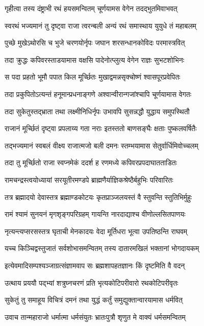 \twolineshloka
{गृहीत्वा तस्य दंष्ट्राभी रथं हयसमन्वितम्}
{चूर्णयामस वेगेन तदद्भुतमिवाभवत्}%

\twolineshloka
{स्वरथं भज्यमानं तु दृष्ट्वा राजा त्वरन्बली}
{अन्यं रथं समास्थाय युयुधे तं महाबलम्}%

\twolineshloka
{पुच्छे मुखेऽथोरसि च भुजे चरणयोर्नृपः}
{जघान शरसन्धानकोविदः परमास्त्रवित्}%

\twolineshloka
{तदा क्रुद्धः कपिवरस्ताडयामास वक्षसि}
{पादेनोत्प्लुत्य वेगेन राज्ञः सुभटशोभिनः}%

\twolineshloka
{स पदा प्रहतो भूमौ पपात किल मूर्च्छितः}
{मुखाद्वमन्नसृक्चोष्णं श्वासपूरप्रवेपितः}%

\twolineshloka
{तदा प्रकुपितोऽत्यन्तं हनूमान्प्रधनाङ्गणे}
{अश्वान्वीरान्गजांश्चापि चूर्णयामास वेगतः}%

\twolineshloka
{तदा सुकेतुस्तद्भ्राता तथा लक्ष्मीनिधिर्नृपः}
{उभावपि सुसन्नद्धौ युद्धाय समुपस्थितौ}%

\twolineshloka
{राजानं मूर्च्छितं दृष्ट्वा प्रपलाय्य गता नराः}
{इतस्ततो बाणसङ्घैः क्षताः पुष्कलवर्षितैः}%

\twolineshloka
{तद्भज्यमानं स्वबलं वीक्ष्य राजात्मजो बली}
{दमनः स्तम्भयामास सेतुर्वार्धिमिवोच्चलम्}%

\twolineshloka
{तदा तु मूर्च्छितो राजा स्वप्नमेकं ददर्श ह}
{रणमध्ये कपिवरप्रपदाघातताडितः}%

\twolineshloka
{रामचन्द्रस्त्वयोध्यायां सरयूतीरमण्डपे}
{ब्राह्मणैर्याज्ञिकश्रेष्ठैर्बहुभिः परिवारितः}%

\twolineshloka
{तत्र ब्रह्मादयो देवास्तत्र ब्रह्माण्डकोटयः}
{कृतप्राञ्जलयस्तं वै स्तुवन्ति स्तुतिभिर्मुहुः}%

\twolineshloka
{रामं श्यामं सुनयनं मृगशृङ्गपरिग्रहम्}
{गायन्ति नारदाद्याश्च वीणोल्लसितपाणयः}%

\twolineshloka
{नृत्यन्त्यप्सरसस्तत्र घृताची मेनकादयः}
{वेदा मूर्तिधरा भूत्वा उपतिष्ठन्ति राघवम्}%

\twolineshloka
{यच्च किञ्चिद्वस्तुजातं सर्वशोभासमन्वितम्}
{तस्य दातारमखिलं भक्तानां भोगदायकम्}%

\twolineshloka
{इत्येवमादिसम्पश्यञ्जाग्रत्संज्ञामवाप सः}
{ब्रह्मशापहतज्ञानः किं दृष्टमिति वै वदन्}%

\twolineshloka
{उत्थाय प्रययौ पद्भ्यां शत्रुघ्नचरणं प्रति}
{भृत्यकोटिपरीवारो रथकोटिपरीवृतः}%

\twolineshloka
{सुकेतुं तु समाहूय विचित्रं दमनं तथा}
{युद्धं कर्तुं समुद्युक्तान्वारयामास धर्मवित्}%

\twolineshloka
{उवाच तान्महाराजो धर्मात्मा धर्मसंयुतः}
{भ्रातःपुत्रौ शृणुत मे वाक्यं धर्मसमन्वितम्}%

